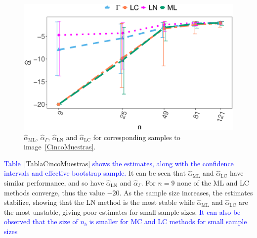 \documentclass[twocolumn]{svjour3}
\begin{document}
\begin{figure}[hbt]
	\centering
	\includegraphics[width=\linewidth]{../../../Figures/PaperTesis/AlfaVsTamCincoMuestrasCorregido_v2.eps}
	\caption{ $\widehat{\alpha}_{\text{{ML}}}$, $\widehat{\alpha}_{\Gamma}$, $\widehat{\alpha}_{\text{{LN}}}$ and $\widehat{\alpha}_{\text{{LC}}}$ for corresponding samples to image~\ref{CincoMuestras}.}\label{AlfaVsTamCincoMuestras}
\end{figure}


\textcolor{blue}{Table~\ref{TablaCincoMuestras} shows the estimates, along with the confidence intervals and effective bootstrap sample. }
It can be seen that $\widehat{\alpha}_{\text{{ML}}}$ and $\widehat{\alpha}_{\text{{LC}}}$ have similar performance, and so have $\widehat{\alpha}_{\text{{LN}}}$ and $\widehat{\alpha}_{\Gamma}$. 
For $n= 9$ none of the ML and LC methods converge, thus the value $-20$. 
As the sample size increases, the estimates stabilize, showing that the LN method is the most stable while $\widehat{\alpha}_{\text{{ML}}}$ and $\widehat{\alpha}_{\text{{LC}}}$ are the most unstable, giving poor estimates for small sample sizes. \textcolor{blue}{It can also be observed that the size of $n_b$ is smaller for MC and LC methods for small sample sizes}


\end{document}
